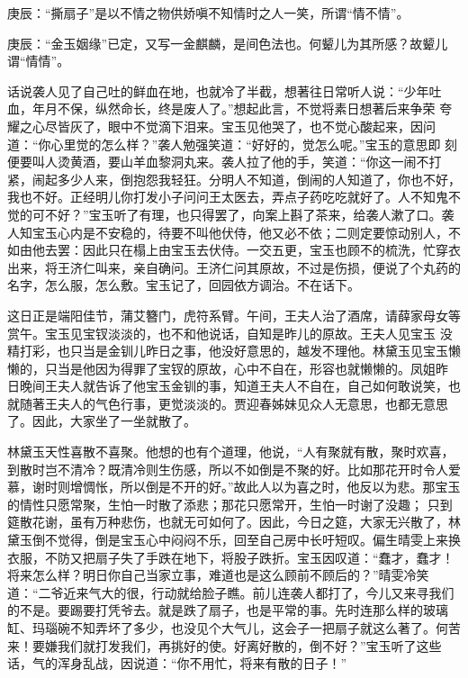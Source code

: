 \begin{parag}
    \begin{note}庚辰：“撕扇子”是以不情之物供娇嗔不知情时之人一笑，所谓“情不情”。\end{note}
\end{parag}


\begin{parag}
    \begin{note}庚辰：“金玉姻缘”已定，又写一金麒麟，是间色法也。何颦儿为其所感？故颦儿谓“情情”。\end{note}
\end{parag}


\begin{parag}
    话说袭人见了自己吐的鲜血在地，也就冷了半截，想著往日常听人说：“少年吐血，年月不保，纵然命长，终是废人了。”想起此言，不觉将素日想著后来争荣 夸耀之心尽皆灰了，眼中不觉滴下泪来。宝玉见他哭了，也不觉心酸起来，因问道：“你心里觉的怎么样？”袭人勉强笑道：“好好的，觉怎么呢。”宝玉的意思即 刻便要叫人烫黄酒，要山羊血黎洞丸来。袭人拉了他的手，笑道：“你这一闹不打紧，闹起多少人来，倒抱怨我轻狂。分明人不知道，倒闹的人知道了，你也不好， 我也不好。正经明儿你打发小子问问王太医去，弄点子药吃吃就好了。人不知鬼不觉的可不好？”宝玉听了有理，也只得罢了，向案上斟了茶来，给袭人漱了口。袭人知宝玉心内是不安稳的，待要不叫他伏侍，他又必不依；二则定要惊动别人，不如由他去罢：因此只在榻上由宝玉去伏侍。一交五更，宝玉也顾不的梳洗，忙穿衣 出来，将王济仁叫来，亲自确问。王济仁问其原故，不过是伤损，便说了个丸药的名字，怎么服，怎么敷。宝玉记了，回园依方调治。不在话下。
\end{parag}


\begin{parag}
    这日正是端阳佳节，蒲艾簪门，虎符系臂。午间，王夫人治了酒席，请薛家母女等赏午。宝玉见宝钗淡淡的，也不和他说话，自知是昨儿的原故。王夫人见宝玉 没精打彩，也只当是金钏儿昨日之事，他没好意思的，越发不理他。林黛玉见宝玉懒懒的，只当是他因为得罪了宝钗的原故，心中不自在，形容也就懒懒的。凤姐昨 日晚间王夫人就告诉了他宝玉金钏的事，知道王夫人不自在，自己如何敢说笑，也就随著王夫人的气色行事，更觉淡淡的。贾迎春姊妹见众人无意思，也都无意思了。因此，大家坐了一坐就散了。
\end{parag}


\begin{parag}
    林黛玉天性喜散不喜聚。他想的也有个道理，他说，“人有聚就有散，聚时欢喜，到散时岂不清冷？既清冷则生伤感，所以不如倒是不聚的好。比如那花开时令人爱慕，谢时则增惆怅，所以倒是不开的好。”故此人以为喜之时，他反以为悲。那宝玉的情性只愿常聚，生怕一时散了添悲；那花只愿常开，生怕一时谢了没趣； 只到筵散花谢，虽有万种悲伤，也就无可如何了。因此，今日之筵，大家无兴散了，林黛玉倒不觉得，倒是宝玉心中闷闷不乐，回至自己房中长吁短叹。偏生晴雯上来换衣服，不防又把扇子失了手跌在地下，将股子跌折。宝玉因叹道：“蠢才，蠢才！将来怎么样？明日你自己当家立事，难道也是这么顾前不顾后的？”晴雯冷笑 道：“二爷近来气大的很，行动就给脸子瞧。前儿连袭人都打了，今儿又来寻我们的不是。要踢要打凭爷去。就是跌了扇子，也是平常的事。先时连那么样的玻璃缸、玛瑙碗不知弄坏了多少，也没见个大气儿，这会子一把扇子就这么著了。何苦来！要嫌我们就打发我们，再挑好的使。好离好散的，倒不好？”宝玉听了这些话，气的浑身乱战，因说道：“你不用忙，将来有散的日子！”
\end{parag}


